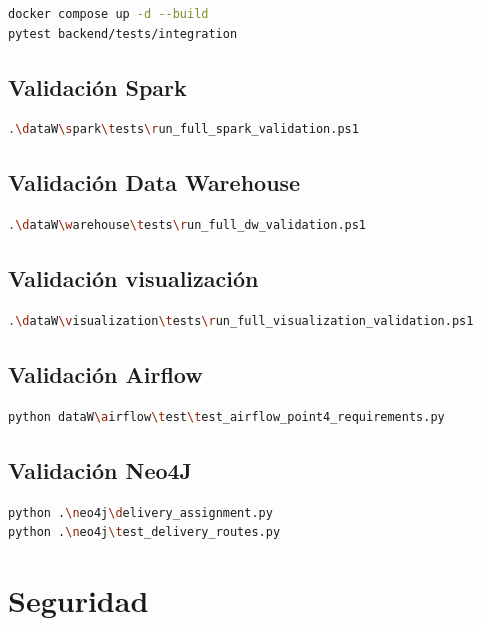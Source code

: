\documentclass[12pt,letterpaper]{article}
\begin{document}
\begin{lstlisting}[language=bash]
docker compose up -d --build
pytest backend/tests/integration
\end{lstlisting}

\subsection{Validación Spark}

\begin{lstlisting}[language=bash]
.\dataW\spark\tests\run_full_spark_validation.ps1
\end{lstlisting}

\subsection{Validación Data Warehouse}

\begin{lstlisting}[language=bash]
.\dataW\warehouse\tests\run_full_dw_validation.ps1
\end{lstlisting}

\subsection{Validación visualización}

\begin{lstlisting}[language=bash]
.\dataW\visualization\tests\run_full_visualization_validation.ps1
\end{lstlisting}

\subsection{Validación Airflow}

\begin{lstlisting}[language=bash]
python dataW\airflow\test\test_airflow_point4_requirements.py
\end{lstlisting}

\subsection{Validación Neo4J}

\begin{lstlisting}[language=bash]
python .\neo4j\delivery_assignment.py
python .\neo4j\test_delivery_routes.py
\end{lstlisting}

\section{Seguridad}
\end{document}
